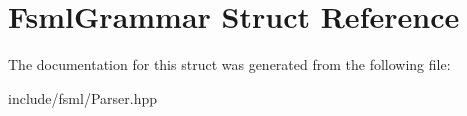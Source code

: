 \hypertarget{structFsmlGrammar}{\section{Fsml\-Grammar Struct Reference}
\label{structFsmlGrammar}
}


The documentation for this struct was generated from the following file\-:\begin{DoxyCompactItemize}
\item 
include/fsml/Parser.\-hpp\end{DoxyCompactItemize}
